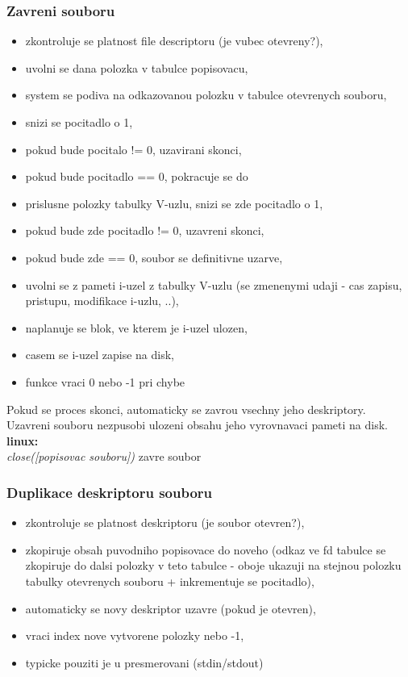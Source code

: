 \documentclass[a4paper, 11pt]{article}
\begin{document}
\newpage

\subsubsection{Zavreni souboru}
\begin{itemize}
    \item zkontroluje se platnost file descriptoru (je vubec otevreny?),
    \item uvolni se dana polozka v tabulce popisovacu,
    \item system se podiva na odkazovanou polozku v tabulce otevrenych souboru,
    \item snizi se pocitadlo o 1,
    \item pokud bude pocitalo != 0, uzavirani skonci,
    \item pokud bude pocitadlo == 0, pokracuje se do 
    \item prislusne polozky tabulky V-uzlu, snizi se zde pocitadlo o 1,
    \item pokud bude zde pocitadlo != 0, uzavreni skonci,
    \item pokud bude zde == 0, soubor se definitivne uzarve,
    \item uvolni se z pameti i-uzel z tabulky V-uzlu (se zmenenymi udaji - cas zapisu, pristupu, modifikace i-uzlu, ..),
    \item naplanuje se blok, ve kterem je i-uzel ulozen,
    \item casem se i-uzel zapise na disk,
    \item funkce vraci 0 nebo -1 pri chybe \\
\end{itemize}

Pokud se proces skonci, automaticky se zavrou vsechny jeho deskriptory. Uzavreni souboru nezpusobi ulozeni obsahu jeho vyrovnavaci pameti na disk. \\

\textbf{linux:} \\[0.5em]
\textit{close([popisovac souboru])} zavre soubor \\

\subsubsection{Duplikace deskriptoru souboru}
\begin{itemize}
    \item zkontroluje se platnost deskriptoru (je soubor otevren?),
    \item zkopiruje obsah puvodniho popisovace do noveho (odkaz ve fd tabulce se zkopiruje do dalsi polozky v teto tabulce - oboje ukazuji na stejnou polozku tabulky otevrenych souboru + inkrementuje se pocitadlo), 
    \item automaticky se novy deskriptor uzavre (pokud je otevren),
    \item vraci index nove vytvorene polozky nebo -1,
    \item typicke pouziti je u presmerovani (stdin/stdout) \\
\end{itemize}
\end{document}
